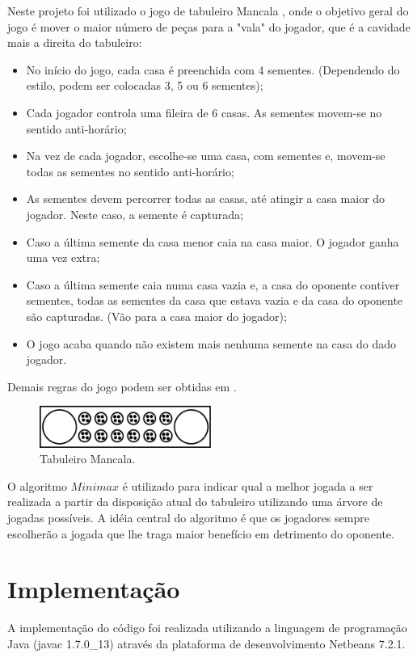\documentclass[a4paper,11pt]{article}
\begin{document}
Neste projeto foi utilizado o jogo de tabuleiro Mancala\cite{MANCALA, KALAH} , onde o objetivo geral do jogo é mover o maior número de peças para a "vala" do jogador, que é a cavidade mais a direita do tabuleiro:
\begin{itemize}
  \item No início do jogo, cada casa é preenchida com 4 sementes. (Dependendo do estilo, podem ser colocadas 3, 5 ou 6 sementes);
  \item Cada jogador controla uma fileira de 6 casas. As sementes movem-se no sentido anti-horário;
  \item Na vez de cada jogador, escolhe-se uma casa, com sementes e, movem-se todas as sementes no sentido anti-horário;
  \item As sementes devem percorrer todas as casas, até atingir a casa maior do jogador. Neste caso, a semente é capturada;
  \item Caso a última semente da casa menor caia na casa maior. O jogador ganha uma vez extra;
  \item Caso a última semente caia numa casa vazia e, a casa do oponente contiver sementes, todas as sementes da casa que estava vazia e da casa do oponente são capturadas. (Vão para a casa maior do jogador);
  \item O jogo acaba quando não existem mais nenhuma semente na casa do dado jogador.
\end{itemize}
Demais regras do jogo podem ser obtidas em \cite{MANCALA, KALAH}.
\begin{figure}[h!]
    \includegraphics[width=0.5\textwidth]{mancala.pdf}
  \centering
  \caption{Tabuleiro Mancala.}
  \centering

\end{figure}

O algoritmo $Minimax$\cite{MINIMAX} é utilizado para indicar qual a melhor jogada a ser realizada a partir da disposição atual do tabuleiro utilizando uma árvore de jogadas possíveis. A idéia central do algoritmo é que os jogadores sempre escolherão a jogada que lhe traga maior benefício em detrimento do oponente.

\section{Implementação}
A implementação do código foi realizada utilizando a linguagem de programação Java (javac 1.7.0\_13) através da plataforma de desenvolvimento Netbeans 7.2.1.\\
\end{document}
